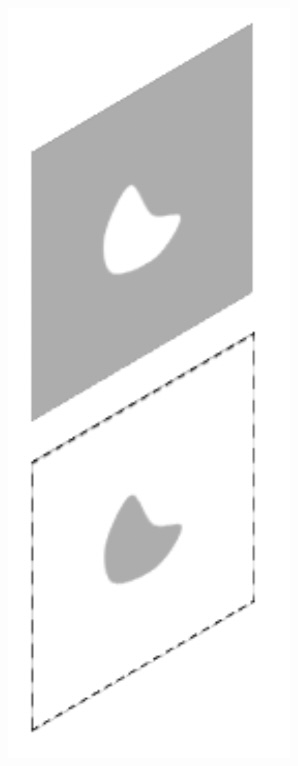 \begin{marginfigure}
	\centering
	\includegraphics[width = .8 \textwidth, height = .8 \textheight]{figs/kirchhoff-diffraction-3}
	\label{fig:kirchhoff3}
\end{marginfigure}
